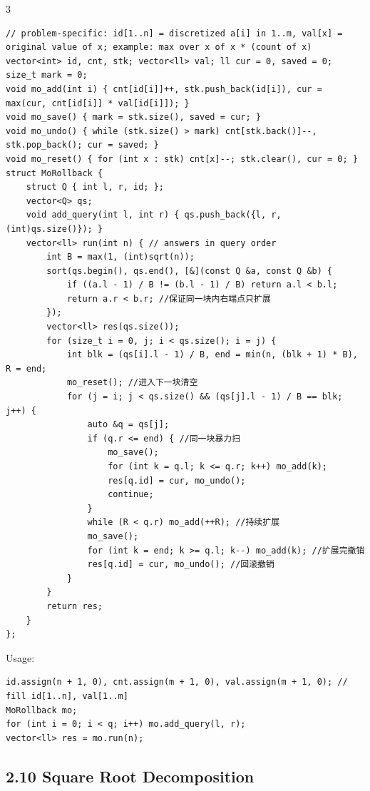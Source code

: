 \documentclass[8pt]{extarticle}
\begin{document}
\begin{multicols*}{3}
\begin{lstlisting}
// problem-specific: id[1..n] = discretized a[i] in 1..m, val[x] = original value of x; example: max over x of x * (count of x)
vector<int> id, cnt, stk; vector<ll> val; ll cur = 0, saved = 0; size_t mark = 0;
void mo_add(int i) { cnt[id[i]]++, stk.push_back(id[i]), cur = max(cur, cnt[id[i]] * val[id[i]]); }
void mo_save() { mark = stk.size(), saved = cur; }
void mo_undo() { while (stk.size() > mark) cnt[stk.back()]--, stk.pop_back(); cur = saved; }
void mo_reset() { for (int x : stk) cnt[x]--; stk.clear(), cur = 0; }
struct MoRollback {
    struct Q { int l, r, id; };
    vector<Q> qs;
    void add_query(int l, int r) { qs.push_back({l, r, (int)qs.size()}); }
    vector<ll> run(int n) { // answers in query order
        int B = max(1, (int)sqrt(n));
        sort(qs.begin(), qs.end(), [&](const Q &a, const Q &b) {
            if ((a.l - 1) / B != (b.l - 1) / B) return a.l < b.l;
            return a.r < b.r; //保证同一块内右端点只扩展
        });
        vector<ll> res(qs.size());
        for (size_t i = 0, j; i < qs.size(); i = j) {
            int blk = (qs[i].l - 1) / B, end = min(n, (blk + 1) * B), R = end;
            mo_reset(); //进入下一块清空
            for (j = i; j < qs.size() && (qs[j].l - 1) / B == blk; j++) {
                auto &q = qs[j];
                if (q.r <= end) { //同一块暴力扫
                    mo_save();
                    for (int k = q.l; k <= q.r; k++) mo_add(k);
                    res[q.id] = cur, mo_undo();
                    continue;
                }
                while (R < q.r) mo_add(++R); //持续扩展
                mo_save();
                for (int k = end; k >= q.l; k--) mo_add(k); //扩展完撤销
                res[q.id] = cur, mo_undo(); //回滚撤销
            }
        }
        return res;
    }
};
\end{lstlisting}

Usage:

\begin{lstlisting}
id.assign(n + 1, 0), cnt.assign(m + 1, 0), val.assign(m + 1, 0); // fill id[1..n], val[1..m]
MoRollback mo;
for (int i = 0; i < q; i++) mo.add_query(l, r);
vector<ll> res = mo.run(n);
\end{lstlisting}

\subsection*{2.10 Square Root Decomposition}


\end{multicols*}
\end{document}
